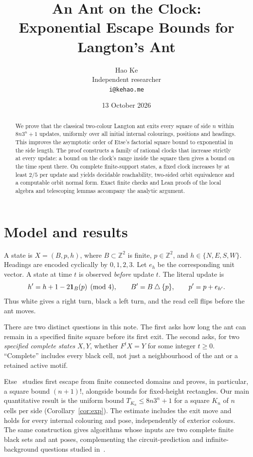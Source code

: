 \documentclass[11pt,a4paper]{article}
\title{An Ant on the Clock:\\Exponential Escape Bounds for Langton's Ant}
\author{Hao Ke\\Independent researcher\\\texttt{i@kehao.me}}
\date{13 October 2026}
\theoremstyle{remark}\newtheorem{remark}[theorem]{Remark}
\newcommand{\Z}{\mathbb Z}\newcommand{\N}{\mathbb N}\newcommand{\Q}{\mathbb Q}
\begin{document}
\maketitle
\begin{abstract}
We prove that the classical two-colour Langton ant exits every square of side
$n$ within $8n3^n+1$ updates, uniformly over all initial internal colourings,
positions and headings. This improves the asymptotic order of Etse's factorial
square bound to exponential in the side length. The proof constructs a family
of rational clocks that increase strictly at every update: a bound on the
clock's range inside the square then gives a bound on the time spent there.
On complete finite-support states, a fixed clock increases by at least $2/5$
per update and yields decidable reachability, two-sided orbit equivalence and
a computable orbit normal form. Exact finite checks and Lean proofs of the
local algebra and telescoping lemmas accompany the analytic argument.
\end{abstract}

\section{Model and results}
A state is $X=(B,p,h)$, where $B\subset\Z^2$ is finite, $p\in\Z^2$, and
$h\in\{N,E,S,W\}$. Headings are encoded cyclically by $0,1,2,3$.
Let $e_h$ be the corresponding unit vector. A state at time $t$ is observed
\emph{before} update $t$. The literal update is
\begin{equation}\label{eq:rule}
 h'=h+1-2\mathbf1_B(p)\pmod4,\qquad
 B'=B\mathbin{\triangle}\{p\},\qquad p'=p+e_{h'}.
\end{equation}
Thus white gives a right turn, black a left turn, and the read cell flips
before the ant moves.

There are two distinct questions in this note. The first asks how long the ant
can remain in a specified finite square before its first exit. The second asks,
for two \emph{specified complete states} $X,Y$, whether $F^tX=Y$ for some
integer $t\ge0$. ``Complete'' includes every black cell, not just a neighbourhood
of the ant or a retained active motif.

Etse~\cite{Etse2026} studies first escape from finite connected domains and proves,
in particular, a square bound $(n+1)!$, alongside bounds for fixed-height
rectangles. Our main quantitative result is the uniform bound
$T_{K_n}\le8n3^n+1$ for a square $K_n$ of $n$ cells per side
(Corollary~\ref{cor:exp}). The estimate includes the exit move and holds for
every internal colouring and pose, independently of exterior colours.
The same construction gives algorithms whose inputs are two complete finite
black sets and ant poses, complementing the circuit-prediction and
infinite-background questions studied in~\cite{Gajardo2002}.
\end{document}
